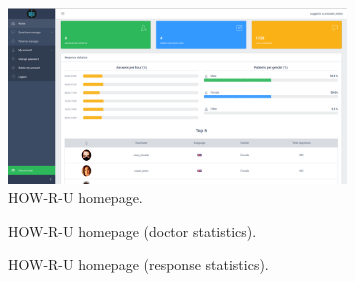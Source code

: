 \documentclass[12pt,english]{article}
\begin{document}
\begin{figure}[H]
    \centering
    \includegraphics[width=0.8\textwidth]{homepage.png}
    \caption{HOW-R-U homepage.}
\end{figure}

\begin{figure}[H]
    \caption{HOW-R-U homepage (doctor statistics).}
\end{figure}


\begin{figure}[H]
    \caption{HOW-R-U homepage (response statistics).}
\end{figure}
\end{document}
